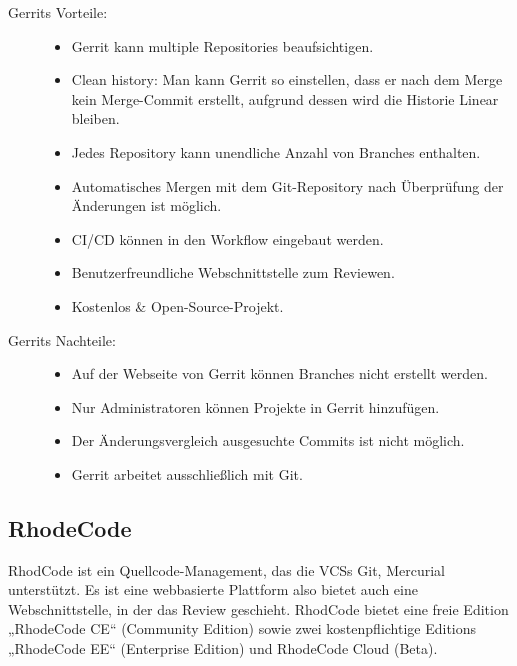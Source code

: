\begin{description}
	\item [Gerrits Vorteile:] \hfill
	\begin{itemize}
		\item Gerrit kann multiple Repositories beaufsichtigen.
		\item Clean history: Man kann Gerrit so einstellen, dass er nach dem Merge kein Merge-Commit erstellt, aufgrund dessen wird die Historie Linear bleiben.
		\item Jedes Repository kann unendliche Anzahl von Branches enthalten.
		\item Automatisches Mergen mit dem Git-Repository nach Überprüfung der Änderungen ist möglich.
		\item \ac{CI}/\ac{CD} können in den Workflow eingebaut werden.
		\item Benutzerfreundliche Webschnittstelle zum Reviewen.
		\item Kostenlos \& Open-Source-Projekt.
	\end{itemize}
	
	\item [Gerrits Nachteile:] \hfill
	\begin{itemize}
		\item Auf der Webseite von Gerrit können Branches nicht erstellt werden.
		\item Nur Administratoren können Projekte in Gerrit hinzufügen.
		\item Der Änderungsvergleich ausgesuchte Commits ist nicht möglich.
		\item Gerrit arbeitet ausschließlich mit Git.
	\end{itemize}
\end{description}

\subsection{RhodeCode}
\label{subsec:RhodeCode}

RhodCode ist ein Quellcode-Management, das die \acp{VCS} Git, Mercurial unterstützt. Es ist eine webbasierte Plattform also bietet auch eine Webschnittstelle, in der das Review geschieht.
RhodCode bietet eine freie Edition „RhodeCode CE“ (Community Edition) sowie zwei kostenpflichtige Editions „RhodeCode EE“ (Enterprise Edition) und RhodeCode Cloud (Beta).

